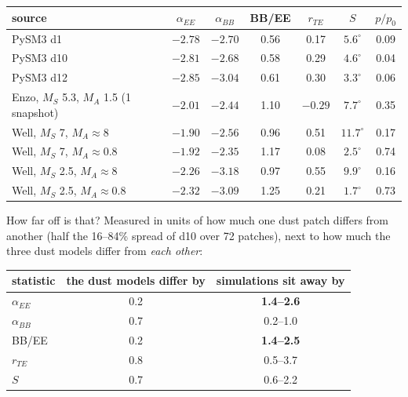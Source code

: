 \documentclass[10pt,a4paper]{article}
\begin{document}
\begin{center}\small
\begin{tabular}{lcccccc}
\toprule
source & $\alpha_{EE}$ & $\alpha_{BB}$ & BB/EE & $r_{TE}$ & $S$ & $p/p_0$\\
\midrule
PySM3 d1  & $-2.78$ & $-2.70$ & 0.56 & 0.17 & $5.6^\circ$ & 0.09\\
PySM3 d10 & $-2.81$ & $-2.68$ & 0.58 & 0.29 & $4.6^\circ$ & 0.04\\
PySM3 d12 & $-2.85$ & $-3.04$ & 0.61 & 0.30 & $3.3^\circ$ & 0.06\\
\midrule
Enzo, $M_S$ 5.3, $M_A$ 1.5 (1 snapshot) & $-2.01$ & $-2.44$ & 1.10 & $-0.29$ & $7.7^\circ$ & 0.35\\
Well, $M_S$ 7, $M_A\approx8$   & $-1.90$ & $-2.56$ & 0.96 & 0.51 & $11.7^\circ$ & 0.17\\
Well, $M_S$ 7, $M_A\approx0.8$ & $-1.92$ & $-2.35$ & 1.17 & 0.08 & $2.5^\circ$ & 0.74\\
Well, $M_S$ 2.5, $M_A\approx8$   & $-2.26$ & $-3.18$ & 0.97 & 0.55 & $9.9^\circ$ & 0.16\\
Well, $M_S$ 2.5, $M_A\approx0.8$ & $-2.32$ & $-3.09$ & 1.25 & 0.21 & $1.7^\circ$ & 0.73\\
\bottomrule
\end{tabular}
\end{center}

How far off is that? Measured in units of how much one dust patch differs from
another (half the 16--84\% spread of d10 over 72 patches), next to how much the
three dust models differ from \emph{each other}:

\begin{center}\small
\begin{tabular}{lcc}
\toprule
statistic & the dust models differ by & simulations sit away by\\
\midrule
$\alpha_{EE}$ & 0.2 & \textbf{1.4--2.6}\\
$\alpha_{BB}$ & 0.7 & 0.2--1.0\\
BB/EE         & 0.2 & \textbf{1.4--2.5}\\
$r_{TE}$      & 0.8 & 0.5--3.7\\
$S$           & 0.7 & 0.6--2.2\\
\bottomrule
\end{tabular}
\end{center}
\end{document}
